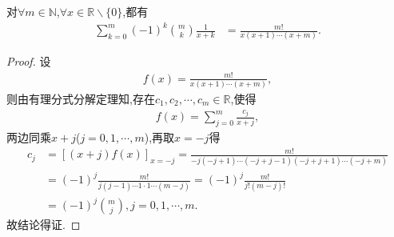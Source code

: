 \documentclass[../../main.tex]{subfiles}
\begin{document}
\begin{proposition}\label{proposition:组合数相关常用恒等式}
对$\forall m\in \mathbb{N}$,$\forall x\in \mathbb{R} \backslash \{0\}$,都有
\begin{align*}
\sum_{k=0}^m{(-1) ^k\binom{m}{k}\frac{1}{x+k}}&=\frac{m!}{x(x+1)\cdots(x+m)}.
\end{align*}
\end{proposition}
\begin{proof}
设
\begin{align*}
f(x)=\frac{m!}{x(x+1)\cdots(x+m)},
\end{align*}
则由有理分式分解定理知,存在$c_1,c_2,\cdots ,c_m\in \mathbb{R}$,使得
\begin{align*}
f(x)=\sum_{j=0}^m{\frac{c_j}{x+j}},
\end{align*}
两边同乘$x+j$($j=0,1,\cdots ,m$),再取$x=-j$得
\begin{align*}
c_j&=\left[ (x+j) f(x) \right] _{x=-j}=\frac{m!}{-j(-j+1)\cdots(-j+j-1)(-j+j+1)\cdots(-j+m)}
\\
&=(-1) ^j\frac{m!}{j(j-1)\cdots 1\cdot 1\cdots(m-j)}=(-1) ^j\frac{m!}{j!(m-j)!}
\\
&=(-1) ^j\binom{m}{j},j=0,1,\cdots ,m.
\end{align*}
故结论得证.

\end{proof}
\end{document}
